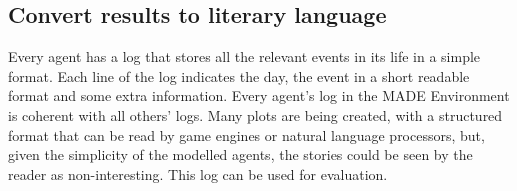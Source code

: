 \documentclass{sig-alternate}
\begin{document}
\subsection{Convert results to literary language}

Every agent has a log that stores all the relevant events in its life
in a simple format. Each line of the log indicates the day, the event
in a short readable format and some extra information. Every agent's
log in the MADE Environment is coherent with all others' logs. Many
plots are being created, with a structured format that can be read by
game engines or natural language processors, but, given the simplicity
of the modelled agents, the stories could be seen by the reader as
non-interesting. This log can be used for evaluation. %












\end{document}
